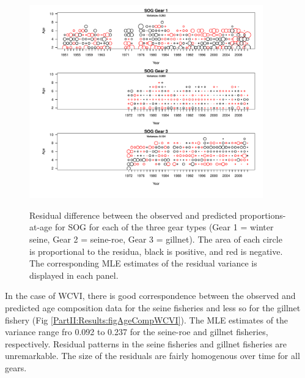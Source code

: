 \begin{figure}
	\centering
	\includegraphics[width=0.9\textwidth]{../FIGS/qPriorFigs/iscam_fig_agecompsresid_SOG.pdf}\\
	\caption{Residual difference between the observed and predicted proportions-at-age for SOG for each of the three gear types (Gear 1 = winter seine, Gear 2 = seine-roe, Gear 3 = gillnet).  The area of each circle is proportional to the residua, black is positive, and red is negative.  The corresponding MLE estimates of the residual variance is displayed in each panel.}\label{PartII:Results:figAgeCompSOG}
\end{figure}

In the case of WCVI, there is good correspondence between the observed and predicted age composition data for the seine fisheries and less so for the gillnet fishery (Fig \ref{PartII:Results:figAgeCompWCVI}).  The MLE estimates of the variance range fro 0.092 to 0.237 for the seine-roe and gillnet fisheries, respectively.  Residual patterns in the seine fisheries and gillnet fisheries are unremarkable.   The size of the residuals are fairly homogenous over time for all gears.


